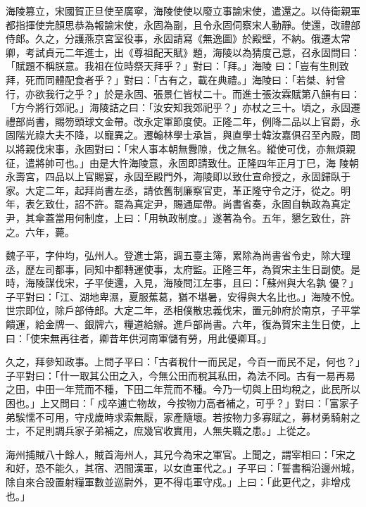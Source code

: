 \begin{pinyinscope}
 海陵篡立，宋國賀正旦使至廣寧，海陵使使以廢立事諭宋使，遣還之。以侍衛親軍都指揮使完顏思恭為報諭宋使，永固為副，且令永固伺察宋人動靜。使還，改禮部侍郎。久之，分護燕京宮室役事，永固請寫《無逸圖》於殿壁，不納。俄遷太常卿，考試貞元二年進士，出《尊祖配天賦》題，海陵以為猜度己意，召永固問曰：「賦題不稱朕意。我祖在位時祭天拜乎？」對曰：「拜。」海陵
 曰：「豈有生則致拜，死而同體配食者乎？」對曰：「古有之，載在典禮。」海陵曰：「若桀、紂曾行，亦欲我行之乎？」於是永固、張景仁皆杖二十。而進士張汝霖賦第八韻有曰：「方今將行郊祀。」海陵詰之曰：「汝安知我郊祀乎？」亦杖之三十。頃之，永固遷禮部尚書，賜笏頭球文金帶。改永定軍節度使。正隆二年，例降二品以上官爵，永固階光祿大夫不降，以寵異之。遷翰林學士承旨，與直學士韓汝嘉俱召至內殿，問以將親伐宋事，永固對曰：「宋人事本朝無釁隙，伐之無名。縱使可伐，亦無煩親征，遣將帥可也。」由是大忤海陵意，永固即請致仕。正隆四年正月丁巳，海
 陵朝永壽宮，四品以上官賜宴，永固至殿門外，海陵即以致仕宣命授之，永固歸臥于家。大定二年，起拜尚書左丞，請依舊制廉察官吏，革正隆守令之汙，從之。明年，表乞致仕，詔不許。罷為真定尹，賜通犀帶。尚書省奏，永固自執政為真定尹，其傘蓋當用何制度，上曰：「用執政制度。」遂著為令。五年，懇乞致仕，許之。六年，薨。



 魏子平，字仲均，弘州人。登進士第，調五臺主簿，累除為尚書省令史，除大理丞，歷左司都事，同知中都轉運使事，太府監。正隆三年，為賀宋主生日副使。是時，海陵謀伐宋，子平使還，入見，海陵問江左事，且曰：「蘇州與大名孰
 優？」子平對曰：「江、湖地卑濕，夏服蕉葛，猶不堪暑，安得與大名比也。」海陵不悅。世宗即位，除戶部侍郎。大定二年，丞相僕散忠義伐宋，置元帥府於南京，子平掌饋運，給金牌一、銀牌六，糧道給辦。進戶部尚書。六年，復為賀宋主生日使，上曰：「使宋無再往者，卿昔年供河南軍儲有勞，用此優卿耳。」



 久之，拜參知政事。上問子平曰：「古者稅什一而民足，今百一而民不足，何也？」子平對曰：「什一取其公田之入，今無公田而稅其私田，為法不同。古有一易再易之田，中田一年荒而不種，下田二年荒而不種。今乃一切與上田均稅之，此民所以困也。」上又問曰：「
 戍卒逋亡物故，今按物力高者補之，可乎？」對曰：「富家子弟騃懦不可用，守戍歲時求索無厭，家產隨壞。若按物力多寡賦之，募材勇騎射之士，不足則調兵家子弟補之，庶幾官收實用，人無失職之患。」上從之。



 海州捕賊八十餘人，賊首海州人，其兄今為宋之軍官。上聞之，謂宰相曰：「宋之和好，恐不能久，其宿、泗間漢軍，以女直軍代之。」子平曰：「誓書稱沿邊州城，除自來合設置射糧軍數並巡尉外，更不得屯軍守戍。」上曰：「此更代之，非增戍也。」




\end{pinyinscope}
